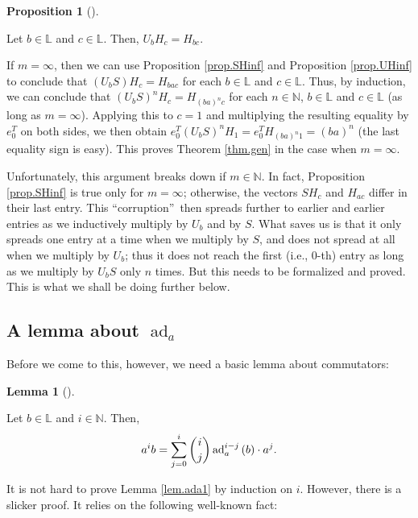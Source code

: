 \documentclass[numbers=enddot,12pt,final,onecolumn,notitlepage]{scrartcl}%
\theoremstyle{definition}
\newtheorem{lem}[theo]{Lemma}
\newenvironment{lemma}[1][]
{\begin{lem}[#1]\begin{leftbar}}
{\end{leftbar}\end{lem}}
\newtheorem{prop}[theo]{Proposition}
\newenvironment{proposition}[1][]
{\begin{prop}[#1]\begin{leftbar}}
{\end{leftbar}\end{prop}}
\let\sumnonlimits\sum
\renewcommand{\sum}{\sumnonlimits\limits}
\begin{document}
\begin{proposition}
\label{prop.UHinf}Let $b\in\mathbb{L}$ and $c\in\mathbb{L}$. Then, $U_{b}%
H_{c}=H_{bc}$.
\end{proposition}

If $m=\infty$, then we can use Proposition \ref{prop.SHinf} and Proposition
\ref{prop.UHinf} to conclude that $\left(  U_{b}S\right)  H_{c}=H_{bac}$ for
each $b\in\mathbb{L}$ and $c\in\mathbb{L}$. Thus, by induction, we can
conclude that $\left(  U_{b}S\right)  ^{n}H_{c}=H_{\left(  ba\right)  ^{n}c}$
for each $n\in\mathbb{N}$, $b\in\mathbb{L}$ and $c\in\mathbb{L}$ (as long as
$m=\infty$). Applying this to $c=1$ and multiplying the resulting equality by
$e_{0}^{T}$ on both sides, we then obtain $e_{0}^{T}\left(  U_{b}S\right)
^{n}H_{1}=e_{0}^{T}H_{\left(  ba\right)  ^{n}1}=\left(  ba\right)  ^{n}$ (the
last equality sign is easy). This proves Theorem \ref{thm.gen} in the case
when $m=\infty$.

Unfortunately, this argument breaks down if $m\in\mathbb{N}$. In fact,
Proposition \ref{prop.SHinf} is true only for $m=\infty$; otherwise, the
vectors $SH_{c}$ and $H_{ac}$ differ in their last entry. This
\textquotedblleft corruption\textquotedblright\ then spreads further to
earlier and earlier entries as we inductively multiply by $U_{b}$ and by $S$.
What saves us is that it only spreads one entry at a time when we multiply by
$S$, and does not spread at all when we multiply by $U_{b}$; thus it does not
reach the first (i.e., $0$-th) entry as long as we multiply by $U_{b}S$ only
$n$ times. But this needs to be formalized and proved. This is what we shall
be doing further below.

\subsection{A lemma about $\operatorname*{ad}\nolimits_{a}$}

Before we come to this, however, we need a basic lemma about commutators:

\begin{lemma}
\label{lem.ada1}Let $b\in\mathbb{L}$ and $i\in\mathbb{N}$. Then,%
\[
a^{i}b=\sum_{j=0}^{i}\dbinom{i}{j}\operatorname*{ad}\nolimits_{a}^{i-j}\left(
b\right)  \cdot a^{j}.
\]

\end{lemma}

It is not hard to prove Lemma \ref{lem.ada1} by induction on $i$. However,
there is a slicker proof. It relies on the following well-known fact:
\end{document}
